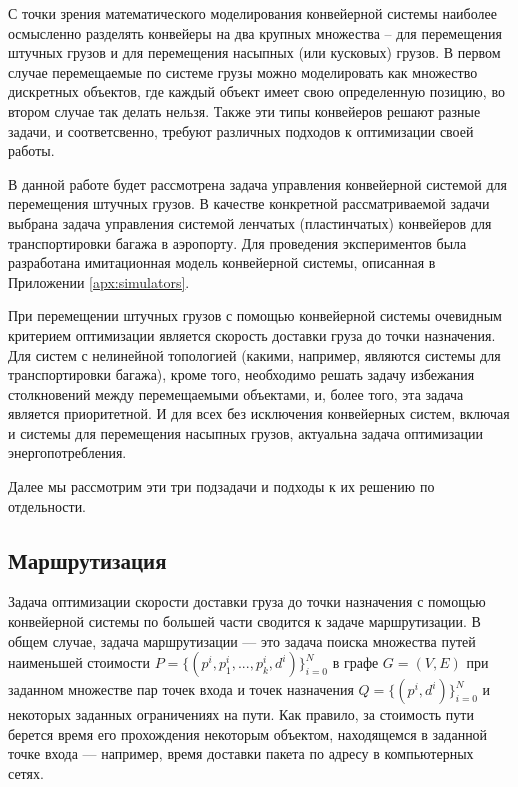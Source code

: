 \documentclass[specification,annotation,times]{itmo-student-thesis}
\theoremstyle{definition}
\begin{document}
С точки зрения математического моделирования конвейерной системы наиболее
осмысленно разделять конвейеры на два крупных множества -- для
перемещения штучных грузов и для перемещения насыпных (или кусковых) грузов.
В первом случае перемещаемые по системе грузы можно моделировать как множество
дискретных объектов, где каждый объект имеет свою определенную позицию, во
втором случае так делать нельзя. Также эти типы конвейеров решают разные задачи,
и соответсвенно, требуют различных подходов к оптимизации своей работы.

В данной работе будет рассмотрена задача управления конвейерной системой для
перемещения штучных грузов. В качестве конкретной рассматриваемой задачи выбрана
задача управления системой ленчатых (пластинчатых) конвейеров для
транспортировки багажа в аэропорту. Для проведения экспериментов 
была разработана имитационная модель конвейерной системы, описанная в Приложении
\ref{apx:simulators}.

При перемещении штучных грузов с помощью конвейерной системы очевидным критерием
оптимизации является скорость доставки груза до точки назначения. Для систем с
нелинейной топологией (какими, например, являются системы для транспортировки
багажа), кроме того, необходимо решать задачу избежания столкновений между
перемещаемыми объектами, и, более того, эта задача является приоритетной.
И для всех без исключения конвейерных систем, включая и системы для перемещения
насыпных грузов, актуальна задача оптимизации энергопотребления.

Далее мы рассмотрим эти три подзадачи и подходы к их решению по отдельности.

\subsection{Маршрутизация}\label{overview:routing}

Задача оптимизации скорости доставки груза до точки назначения с помощью
конвейерной системы по большей части сводится к задаче маршрутизации. В общем
случае, задача маршрутизации --- это задача поиска множества путей наименьшей
стоимости $P = \{(p^i, p_1^i, ... , p_k^i, d^i)\}_{i=0}^N$ в графе $G = (V, E)$ при
заданном множестве пар точек входа и точек назначения
$Q = \{(p^i, d^i)\}_{i=0}^N$ и некоторых заданных ограничениях на пути. Как
правило, за стоимость пути берется время его прохождения некоторым объектом,
находящемся в заданной точке входа --- например, время доставки пакета по адресу
в компьютерных сетях.
\end{document}
